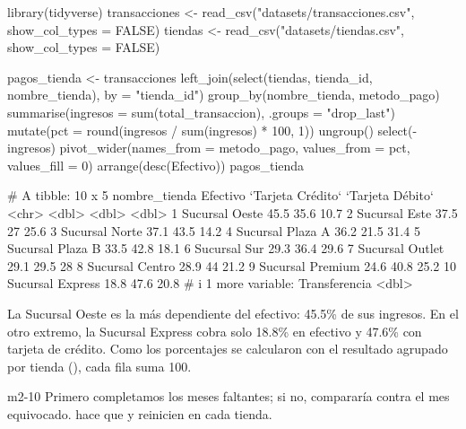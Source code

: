 \begin{rcode}
library(tidyverse)
transacciones <- read_csv("datasets/transacciones.csv",
                          show_col_types = FALSE)
tiendas <- read_csv("datasets/tiendas.csv", show_col_types = FALSE)

pagos_tienda <- transacciones %
  left_join(select(tiendas, tienda_id, nombre_tienda), by = "tienda_id") %
  group_by(nombre_tienda, metodo_pago) %
  summarise(ingresos = sum(total_transaccion), .groups = "drop_last") %
  mutate(pct = round(ingresos / sum(ingresos) * 100, 1)) %
  ungroup() %
  select(-ingresos) %
  pivot_wider(names_from = metodo_pago, values_from = pct,
              values_fill = 0) %
  arrange(desc(Efectivo))
pagos_tienda
\end{rcode}
\begin{rsalida}
# A tibble: 10 x 5
   nombre_tienda    Efectivo `Tarjeta Crédito` `Tarjeta Débito`
   <chr>               <dbl>             <dbl>            <dbl>
 1 Sucursal Oeste       45.5              35.6             10.7
 2 Sucursal Este        37.5              27               25.6
 3 Sucursal Norte       37.1              43.5             14.2
 4 Sucursal Plaza A     36.2              21.5             31.4
 5 Sucursal Plaza B     33.5              42.8             18.1
 6 Sucursal Sur         29.3              36.4             29.6
 7 Sucursal Outlet      29.1              29.5             28  
 8 Sucursal Centro      28.9              44               21.2
 9 Sucursal Premium     24.6              40.8             25.2
10 Sucursal Express     18.8              47.6             20.8
# i 1 more variable: Transferencia <dbl>
\end{rsalida}

La Sucursal Oeste es la más dependiente del efectivo: 45.5\% de sus
ingresos. En el otro extremo, la Sucursal Express cobra solo 18.8\% en
efectivo y 47.6\% con tarjeta de crédito. Como los porcentajes se calcularon
con el resultado agrupado por tienda (),
cada fila suma 100.


\begin{solucion}{m2-10}
Primero completamos los meses faltantes; si no,  compararía
contra el mes equivocado.  hace que
 y  reinicien en cada tienda.
\end{solucion}

